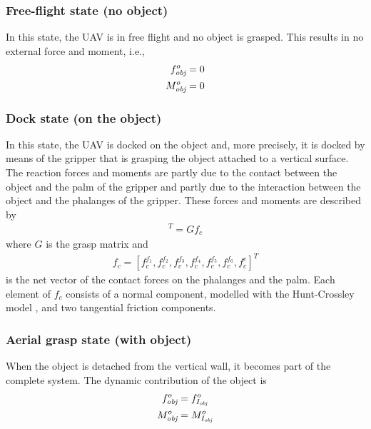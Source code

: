 \documentclass[a4paper, 10pt, conference]{ieeeconf}
\renewcommand{\cdot}{}  %
\begin{document}
\subsubsection{Free-flight state (no object)}
In this state, the UAV is in free flight and no object is grasped. This
results in no external force and moment, i.e.,
\begin{align*}
f_\textit{obj}^{o} &=0 \notag\\
M_\textit{obj}^{o} &=0
\end{align*}

\subsubsection{Dock state (on the object)}
\label{sec:docking}
In this state, the UAV is docked on the object and, more precisely, it is docked by means of the gripper that is grasping the object attached to a vertical surface. The reaction forces and moments are partly due to the contact between the object and the palm of the gripper and partly due to the interaction between the object and the phalanges of the gripper. These forces and moments are described by
\begin{align}
[ f_\textit{obj}^{o}, M_\textit{obj}^{o} ]^T = G \cdot f_c
\label{eq:docked}
\end{align}
where $G$ is the grasp matrix %
and
\begin{align*}
f_c =[ f_c^{f_1}, f_c^{f_2}, f_c^{f_3}, f_c^{f_4}, f_c^{f_5}, f_c^{f_6}, f_c^e ]^T
\end{align*}
is the net vector of the contact forces on the phalanges and the palm. Each element of $f_c$ consists of a normal component, modelled with the Hunt-Crossley model \cite{huntcrossley}, and two tangential friction components.%

\subsubsection{Aerial grasp state (with object)}
When the object is detached from the vertical wall, it becomes part of
the complete system. The dynamic contribution of the object is
\begin{align*}
f_\textit{obj}^{o} &=f_{I_{\textit{obj}}}^o \notag\\
M_\textit{obj}^{o} &=M_{I_{\textit{obj}}}^o
\end{align*}
\end{document}
